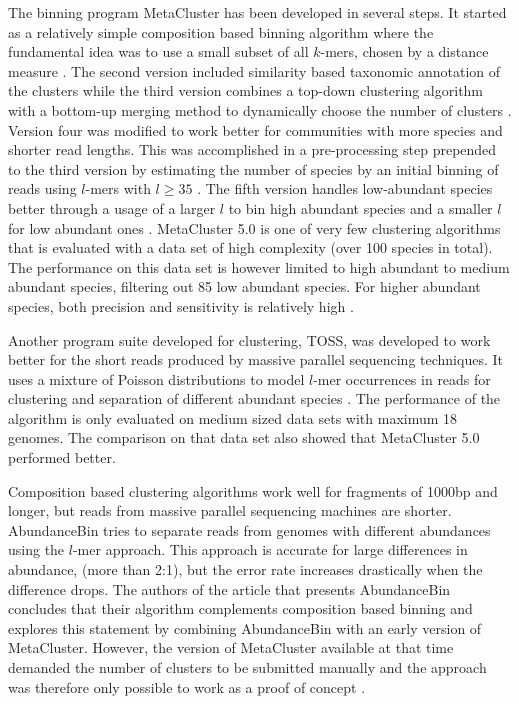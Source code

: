 The binning program MetaCluster has been developed in several steps. It started as a relatively simple composition based binning algorithm where the fundamental idea was to use a small subset of all $k$-mers, chosen by a distance measure \parencite{Yang2010}. The second version included similarity based taxonomic annotation of the clusters \parencite{Yang2010c} while the third version combines a top-down clustering algorithm with a bottom-up merging method to dynamically choose the number of clusters \parencite{Leung2011}. Version four was modified to work better for communities with more species and shorter read lengths. This was accomplished in a pre-processing step prepended to the third version by estimating the number of species by an initial binning of reads using $l$-mers with $l\geq 35$ \parencite{Wang2012h}. The fifth version handles low-abundant species better through a usage of a larger $l$ to bin high abundant species and a smaller $l$ for low abundant ones \parencite{Wang2012}. MetaCluster 5.0 is one of very few clustering algorithms that is evaluated with a data set of high complexity (over 100 species in total). The performance on this data set is however limited to high abundant to medium abundant species, filtering out 85 low abundant species. For higher abundant species, both precision and sensitivity is relatively high \parencite{Wang2012}.

Another program suite developed for clustering, TOSS,  was developed to work better for the short reads produced by massive parallel sequencing techniques. It uses a mixture of Poisson distributions to model $l$-mer occurrences in reads for clustering and separation of different abundant species \parencite{Tanaseichuk2012, Tanaseichuk2012a}. The performance of the algorithm is only evaluated on medium sized data sets with maximum 18 genomes. The comparison on that data set also showed that MetaCluster 5.0 performed better.

Composition based clustering algorithms work well for fragments of 1000bp and longer, but reads from massive parallel sequencing machines are shorter. AbundanceBin tries to separate reads from genomes with different abundances using the $l$-mer approach. This approach is accurate for large differences in abundance, (more than 2:1), but the error rate increases drastically when the difference drops. The authors of the article that presents AbundanceBin concludes that their algorithm complements composition based binning and explores this statement by combining AbundanceBin with an early version of  MetaCluster. However, the version of MetaCluster available at that time demanded the number of clusters to be submitted manually and the approach was therefore only possible to work as a proof of concept \parencite{Wu2011b}. 

